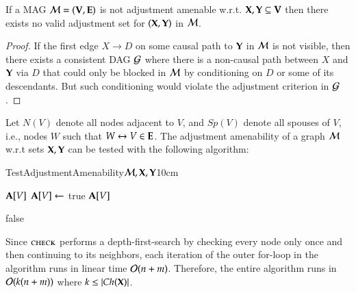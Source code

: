 \begin{lemma}
If a MAG ${\cal M}=({\bf V},{\bf E})$ is not adjustment amenable w.r.t.
${\bf X},{\bf Y} \subseteq {\bf V}$ then there exists no valid adjustment set 
for $({\bf X},{\bf Y})$ in ${\cal M}$.
\label{lemma:amenable}
\end{lemma}
\begin{proof}
If the first edge $X \to D$ on some causal path to ${\bf Y}$ 
in ${\cal M}$ is 
not visible, then there exists a consistent DAG ${\cal G}$ where there is
a non-causal path between $X$ and ${\bf Y}$ via $D$ that could
only be blocked in ${\cal M}$ by conditioning on $D$ or some of its
descendants. But such conditioning would violate the adjustment
criterion in ${\cal G}$.
\end{proof}


Let $N(V)$ denote all nodes adjacent to $V$, 
and $\textit{Sp}(V)$ denote all spouses of $V$, i.e.,
nodes $W$ such that $W \leftrightarrow V \in {\bf E}$.
%
%
%
%
The adjustment amenability of a graph ${\cal M}$ w.r.t 
sets ${\bf X}, {\bf Y}$ can be tested with the following algorithm:

\newcommand{\setvisited}{\bC}
\newcommand{\setcolliders}{\bA}
\begin{algo}{TestAdjustmentAmenability}{${\cal M}, {\bf X}, {\bf Y}$}{\label{algo:isadjustmentamenable}}{10cm}

\State{$\setvisited \gets \emptyset$; $\setcolliders \gets \emptyset$}

\If{$\setvisited[V]$}  {\Return $\setcolliders[V]$}\EndIf
\State{$\setvisited[V] \gets$ true}
%
\State{$\setcolliders[V] \gets ((\textit{Pa}(V) \cup \textit{Sp}(V)) \setminus N(D) \neq \emptyset)$}
 $\setcolliders[V] \gets $ true \EndIf
\EndFor
\Return $\setcolliders[V]$
\EndFunction


 {\Return false}\EndIf
 
\EndFor
\EndFor
\end{algo}

\begin{analal}
Since $\textsc{check}$ performs a depth-first-search
by checking every node only once and then continuing to 
its neighbors, each iteration of the outer for-loop
in the algorithm runs in linear 
time ${\cal O}(n+m)$. Therefore, the entire algorithm runs in ${\cal O}(k(n+m))$
where $k \leq |Ch({\bf X})|$.
\end{analal}


